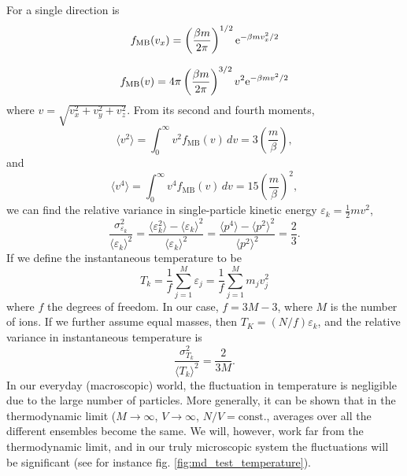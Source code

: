 \documentclass[11pt,bibliography=totoc,index=totoc]{scrbook}   %
\begin{document}
For a single direction is
\begin{equation}
  f_{\text{MB}}(v_x) = \left(\frac{\beta m}{2\pi }\right)^{1/2} \mathrm{e}^{-\beta m v_x^2 / 2}
  \label{eq:maxboltz-vdist-1D}
\end{equation}

\begin{equation}
  f_{\text{MB}}(v) = 4\pi\left(\frac{\beta m}{2\pi }\right)^{3/2} v^2 \mathrm{e}^{-\beta m v^2 / 2}
  \label{eq:maxboltz-vdist}
\end{equation}
where $v=\sqrt{v_x^2+v_y^2+v_z^2}$.
From its second and fourth moments,
\begin{equation}
  \langle v^2 \rangle = \int_0^{\infty} v^2 f_{\text{MB}}(v) \,dv = 3\left(\frac{m}{\beta}\right),
\end{equation}
and
\begin{equation}
  \langle v^4 \rangle = \int_0^{\infty} v^4 f_{\text{MB}}(v) \,dv = 15\left(\frac{m}{\beta}\right)^2,
\end{equation}
we can find the relative variance in single-particle kinetic energy $\varepsilon_k = \frac12 m v^2$,
\begin{equation}
  \frac{\sigma_{\varepsilon_k}^2}{\langle \varepsilon_k \rangle^2} 
  = \frac{\langle \varepsilon_k^2 \rangle - \langle \varepsilon_k \rangle^2}{ \langle \varepsilon_k \rangle^2 }
  = \frac{\langle p^4 \rangle - \langle p^2 \rangle^2}{ \langle p^2 \rangle^2 }
  = \frac{2}{3}.
\end{equation}
If we define the instantaneous temperature to be
\begin{equation}
  T_k = \frac{1}{f} \sum_{j=1}^M \varepsilon_j = \frac{1}{f}\sum_{j=1}^M m_j v_j^2
  \label{eq:kinetictemp}
\end{equation}
where $f$ the degrees of freedom.
In our case, $f=3M-3$, where $M$  is the number of ions.
If we further assume equal masses, then $T_K = (N/f) \varepsilon_k$, and the relative variance in instantaneous temperature is
\begin{equation}
  \frac{\sigma_{T_k}^2}{\langle T_k \rangle^2} = \frac{2}{3M}.
  \label{eq:tempvar}
\end{equation}
In our everyday (macroscopic) world, the fluctuation in temperature is negligible due to the large number of particles. 
More generally, it can be shown that in the thermodynamic limit ($M\to\infty$, $V\to\infty$, $N/V=\text{const.}$, 
averages over all the different ensembles become the same. We will, however, work far from the thermodynamic limit, 
and in our truly microscopic system the fluctuations will be significant (see for instance fig. \ref{fig:md_test_temperature}).
\end{document}
